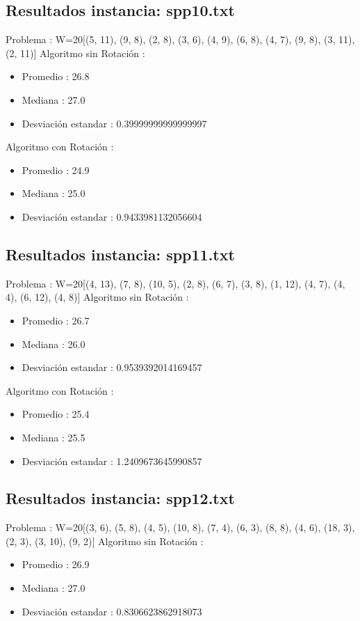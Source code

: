 \documentclass{article}%
\begin{document}
\subsection{Resultados instancia: spp10.txt}%
\label{subsec:Resultadosinstanciaspp10.txt}%
Problema : W=20{[}(5, 11), (9, 8), (2, 8), (3, 6), (4, 9), (6, 8), (4, 7), (9, 8), (3, 11), (2, 11){]} \newline%
%
 Algoritmo sin Rotación : %
\begin{itemize}%
\item%
Promedio : 26.8%
\item%
Mediana : 27.0%
\item%
Desviación estandar : 0.39999999999999997%
\end{itemize}

%
Algoritmo con Rotación : %
\begin{itemize}%
\item%
Promedio : 24.9%
\item%
Mediana : 25.0%
\item%
Desviación estandar : 0.9433981132056604%
\end{itemize}%
\subsection{Resultados instancia: spp11.txt}%
\label{subsec:Resultadosinstanciaspp11.txt}%
Problema : W=20{[}(4, 13), (7, 8), (10, 5), (2, 8), (6, 7), (3, 8), (1, 12), (4, 7), (4, 4), (6, 12), (4, 8){]} \newline%
%
 Algoritmo sin Rotación : %
\begin{itemize}%
\item%
Promedio : 26.7%
\item%
Mediana : 26.0%
\item%
Desviación estandar : 0.9539392014169457%
\end{itemize}

%
Algoritmo con Rotación : %
\begin{itemize}%
\item%
Promedio : 25.4%
\item%
Mediana : 25.5%
\item%
Desviación estandar : 1.2409673645990857%
\end{itemize}%
\subsection{Resultados instancia: spp12.txt}%
\label{subsec:Resultadosinstanciaspp12.txt}%
Problema : W=20{[}(3, 6), (5, 8), (4, 5), (10, 8), (7, 4), (6, 3), (8, 8), (4, 6), (18, 3), (2, 3), (3, 10), (9, 2){]} \newline%
%
 Algoritmo sin Rotación : %
\begin{itemize}%
\item%
Promedio : 26.9%
\item%
Mediana : 27.0%
\item%
Desviación estandar : 0.8306623862918073%
\end{itemize}
\end{document}
